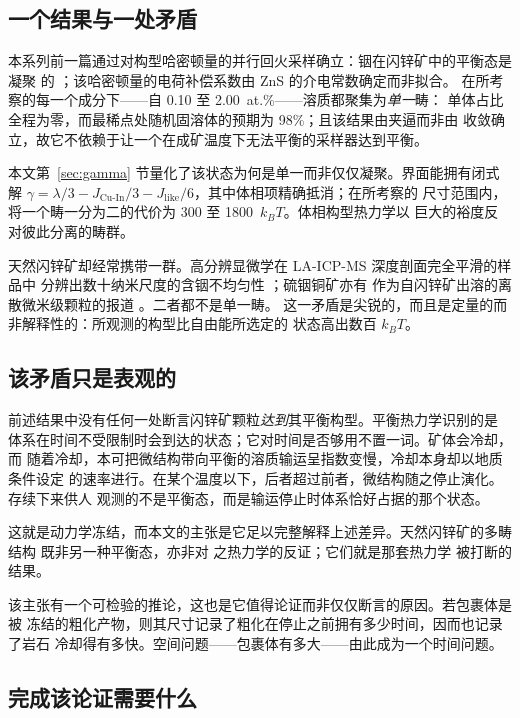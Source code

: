 \documentclass[11pt,a4paper]{ctexart}
\newcommand{\JCuIn}{J_{\mathrm{Cu\text{-}In}}}
\newcommand{\Jlike}{J_{\mathrm{like}}}
\begin{document}
\subsection{一个结果与一处矛盾}

本系列前一篇通过对构型哈密顿量的并行回火采样确立：铟在闪锌矿中的平衡态是凝聚
的 \citep{yu2026b}；该哈密顿量的电荷补偿系数由 ZnS 的介电常数确定而非拟合。
在所考察的每一个成分下——自 0.10 至 2.00~at.\%——溶质都聚集为\emph{单一}畴：
单体占比全程为零，而最稀点处随机固溶体的预期为 98\%；且该结果由夹逼而非由
收敛确立，故它不依赖于让一个在成矿温度下无法平衡的采样器达到平衡。

本文第~\ref{sec:gamma} 节量化了该状态为何是单一而非仅仅凝聚。界面能拥有闭式解
$\gamma = \lambda/3 - \JCuIn/3 - \Jlike/6$，其中体相项精确抵消；在所考察的
尺寸范围内，将一个畴一分为二的代价为 300 至 1800~$k_BT$。体相构型热力学以
巨大的裕度反对彼此分离的畴群。

天然闪锌矿却经常携带一群。高分辨显微学在 LA-ICP-MS 深度剖面完全平滑的样品中
分辨出数十纳米尺度的含铟不均匀性 \citep{cook2009,frenzel2016}；硫铟铜矿亦有
作为自闪锌矿出溶的离散微米级颗粒的报道 \citep{moura2007}。二者都不是单一畴。
这一矛盾是尖锐的，而且是定量的而非解释性的：所观测的构型比自由能所选定的
状态高出数百 $k_BT$。

\subsection{该矛盾只是表观的}

前述结果中没有任何一处断言闪锌矿颗粒\emph{达到}其平衡构型。平衡热力学识别的是
体系在时间不受限制时会到达的状态；它对时间是否够用不置一词。矿体会冷却，而
随着冷却，本可把微结构带向平衡的溶质输运呈指数变慢，冷却本身却以地质条件设定
的速率进行。在某个温度以下，后者超过前者，微结构随之停止演化。存续下来供人
观测的不是平衡态，而是输运停止时体系恰好占据的那个状态。

这就是动力学冻结，而本文的主张是它足以完整解释上述差异。天然闪锌矿的多畴结构
既非另一种平衡态，亦非对 \citet{yu2026b} 之热力学的反证；它们就是那套热力学
被打断的结果。

该主张有一个可检验的推论，这也是它值得论证而非仅仅断言的原因。若包裹体是被
冻结的粗化产物，则其尺寸记录了粗化在停止之前拥有多少时间，因而也记录了岩石
冷却得有多快。空间问题——包裹体有多大——由此成为一个时间问题。

\subsection{完成该论证需要什么}
\end{document}
